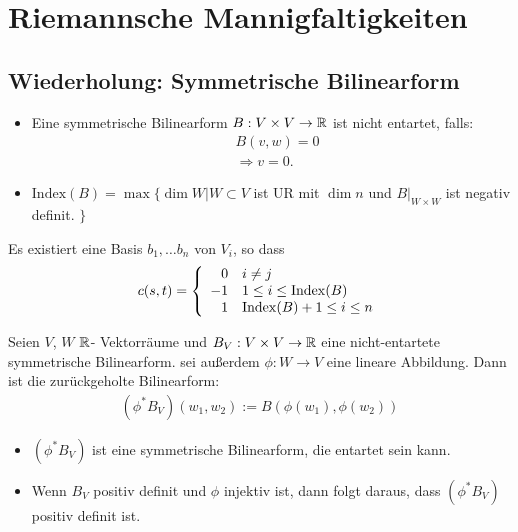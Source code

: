 \chapter{Riemannsche Mannigfaltigkeiten}\label{chapter:riemannschemannigfaltigkeiten}

\section{Wiederholung: Symmetrische Bilinearform}
\begin{defs}
\begin{itemize}
\item Eine symmetrische Bilinearform $B: V \times V \to \mathbb{R}$ ist nicht entartet, falls:
\begin{align*}
&B(v, w) = 0\\
&\Rightarrow v = 0.
\end{align*}
\item $\mathrm{Index}(B) = \max \{ \dim W \vert W \subset V $ ist UR mit $\dim n$ und $B\vert_{W \times W}$ ist negativ definit. $\}$
\end{itemize}
\end{defs}
Es existiert eine Basis ${b_1, \dots b_n}$ von $V_i$, so dass
\begin{align}
c(s, t) = \left\{
\begin{array}{ll}
\hphantom{-} 0 & i \neq j \\
-1 & 1\leq i \leq \mathrm{Index}(B)\\
\hphantom{-} 1 & \mathrm{Index}(B) + 1 \leq i \leq n\\
\end{array}
\right. 
\end{align}
\begin{defs}
Seien $V$, $W$ $\mathbb{R}$- Vektorräume und $B_V : V \times V \to \mathbb{R}$ eine nicht-entartete symmetrische Bilinearform.
sei außerdem $\phi : W \to V$ eine lineare Abbildung.
Dann ist die zurückgeholte Bilinearform:
\begin{align}
(\phi^\ast B_V) (w_1, w_2) := B(\phi(w_1), \phi(w_2))
\end{align}
\end{defs}
\begin{bem}\leavevmode
\begin{itemize}
\item $(\phi^\ast B_V)$ ist eine symmetrische Bilinearform, die entartet sein kann.
\item Wenn $B_V$ positiv definit und $\phi$ injektiv ist, dann folgt daraus, dass $(\phi^\ast B_V)$ positiv definit ist.
\end{itemize}
\end{bem}

